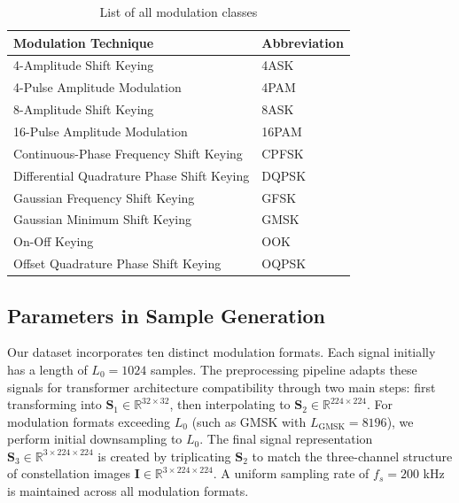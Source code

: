 \begin{table}[htbp]
    \centering
    \caption{List of all modulation classes}
    \begin{tabularx}{\linewidth}{Xl}
    \hline
    \textbf{Modulation Technique} & \textbf{Abbreviation} \\
    \hline
    4-Amplitude Shift Keying & 4ASK \\
    4-Pulse Amplitude Modulation & 4PAM \\
    8-Amplitude Shift Keying & 8ASK \\
    16-Pulse Amplitude Modulation & 16PAM \\
    Continuous-Phase Frequency Shift Keying & CPFSK \\
    Differential Quadrature Phase Shift Keying & DQPSK \\
    Gaussian Frequency Shift Keying & GFSK \\
    Gaussian Minimum Shift Keying & GMSK \\
    On-Off Keying & OOK \\
    Offset Quadrature Phase Shift Keying & OQPSK \\
    \hline
    \end{tabularx}
    \label{tab:modulation_classes}
\end{table}


\subsection{Parameters in Sample Generation}

Our dataset incorporates ten distinct modulation formats. Each signal initially has a length of $L_0 = 1024$ samples. The preprocessing pipeline adapts these signals for transformer architecture compatibility through two main steps: first transforming into $\mathbf{S}_1 \in \mathbb{R}^{32 \times 32}$, then interpolating to $\mathbf{S}_2 \in \mathbb{R}^{224 \times 224}$. For modulation formats exceeding $L_0$ (such as GMSK with $L_\text{GMSK} = 8196$), we perform initial downsampling to $L_0$. The final signal representation $\mathbf{S}_3 \in \mathbb{R}^{3 \times 224 \times 224}$ is created by triplicating $\mathbf{S}_2$ to match the three-channel structure of constellation images $\mathbf{I} \in \mathbb{R}^{3 \times 224 \times 224}$. A uniform sampling rate of $f_s = 200$ kHz is maintained across all modulation formats.


